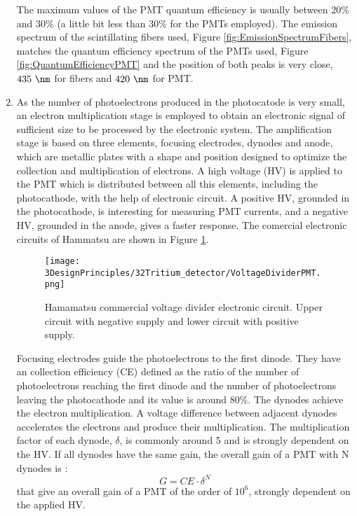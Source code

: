 \begin{enumerate}
The maximum values of the PMT quantum efficiency is usually between $20\%$ and $30\%$ \cite{Knoll} (a little bit less than $30\%$ for the PMTs employed). The emission spectrum of the scintillating fibers used, Figure \ref{fig:EmissionSpectrumFibers}, matches the quantum efficiency spectrum of the PMTs used, Figure \ref{fig:QuantumEfficiencyPMT} and the position of both peaks is very close, $435~\nm$ for fibers and $420~\nm$ for PMT.

\item{} As the number of photoelectrons produced in the photocatode is very small, an electron multiplication stage is employed to obtain an electronic signal of sufficient size to be processed by the electronic system. The amplification stage is based on three elements, focusing electrodes, dynodes and anode, which are metallic plates with a shape and position designed to optimize the collection and multiplication of electrons. A high voltage (HV) is applied to the PMT which is distributed between all this elements, including the photocathode, with the help of electronic circuit. A positive HV, grounded in the photocathode, is interesting for measuring PMT currents, and a negative HV, grounded in the anode, gives a faster response. The comercial electronic circuits of Hammatsu are shown in Figure \ref{fig:VoltageDividerCircuit}.

\begin{figure}[h]
\centering
\texttt{[image: 3DesignPrinciples/32Tritium\_detector/VoltageDividerPMT.png]}
\caption{Hamamatsu commercial voltage divider electronic circuit. Upper circuit with negative supply and lower circuit with positive supply.\label{fig:VoltageDividerCircuit}~\cite{DataSheetPMTs}}
\end{figure}


Focusing electrodes guide the photoelectrons to the first dinode. They have an collection efficiency (CE) defined as the ratio of the number of photoelectrons reaching the first dinode and the number of photoelectrons leaving the photocathode and its value is around $80\%$. The dynodes achieve the electron multiplication. A voltage difference between adjacent dynodes accelerates the electrons and produce their multiplication. The multiplication factor of each dynode, $\delta$, is commonly around 5 and is strongly dependent on the HV. If all dynodes have the same gain, the overall gain of a PMT with N dynodes is \cite{Knoll}:
\begin{equation}
G = CE\cdot{} \delta^N
\label{eq:PMTGain}
\end{equation}
that give an overall gain of a PMT of the order of $10^6$, strongly dependent on the applied HV.


\end{enumerate}
